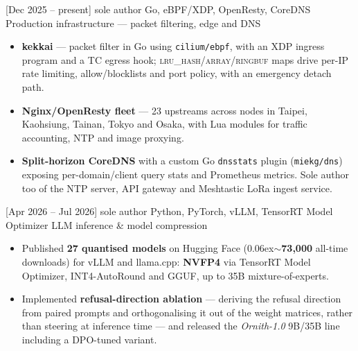 \documentclass{resume}
\begin{document}
\newpage
\begin{projects}
  \project%
    {}[Dec 2025 -- present]%
    {sole author}%
    {Go, eBPF/XDP, OpenResty, CoreDNS}%
    {Production infrastructure --- packet filtering, edge and DNS}%
    {\begin{itemize}
      \item \textbf{kekkai} --- packet filter in Go using \texttt{cilium/ebpf}, with an XDP ingress
        program and a TC egress hook; \textsc{lru\_hash}/\textsc{array}/\textsc{ringbuf} maps drive
        per-IP rate limiting, allow/blocklists and port policy, with an emergency detach path.
      \item \textbf{Nginx/OpenResty fleet} --- 23 upstreams across nodes in Taipei, Kaohsiung,
        Tainan, Tokyo and Osaka, with Lua modules for traffic accounting, NTP and image proxying.
      \item \textbf{Split-horizon CoreDNS} with a custom Go \texttt{dnsstats} plugin
        (\texttt{miekg/dns}) exposing per-domain/client query stats and Prometheus metrics. Sole
        author too of the NTP server, API gateway and Meshtastic LoRa ingest service.
    \end{itemize}}

  \separator{0.7em}

  \project%
    {}[Apr 2026 -- Jul 2026]%
    {sole author}%
    {Python, PyTorch, vLLM, TensorRT Model Optimizer}%
    {LLM inference \& model compression}%
    {\begin{itemize}
      \item Published \textbf{27 quantised models} on Hugging Face
        ({\raise0.06ex\hbox{$\sim$}}\textbf{73,000} all-time downloads) for vLLM and llama.cpp:
        \textbf{NVFP4} via TensorRT Model Optimizer, INT4-AutoRound and GGUF, up to 35B
        mixture-of-experts.
      \item Implemented \textbf{refusal-direction ablation} --- deriving the refusal direction from
        paired prompts and orthogonalising it out of the weight matrices, rather than steering at
        inference time --- and released the \emph{Ornith-1.0} 9B/35B line including a DPO-tuned
        variant.
    \end{itemize}}

  \separator{0.7em}


\end{projects}
\end{document}
